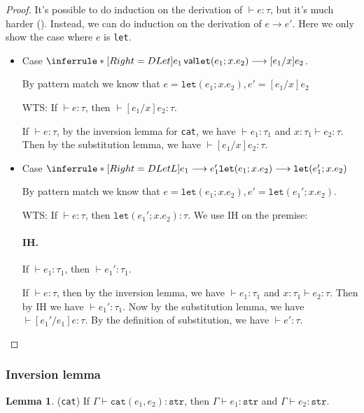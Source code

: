 \documentclass{article}
\theoremstyle{definition}
\newtheorem{lemma}{Lemma}[section]
\begin{document}
\begin{proof}
    It's possible to do induction on the derivation of $\vdash e:\tau$, but it's much harder (\cite{int}). Instead, we can do induction on the derivation of $e\longrightarrow e'$. Here we only show the case where $e$ is \texttt{let}.

    \begin{itemize}
        \item Case $\inferrule*[Right=DLet]{e_1\, \mathsf{val}}{\mathtt{let}(e_1;x.e_2) \longrightarrow [e_1/x]e_2}$.

              By pattern match we know that $e = \mathtt{let}(e_1;x.e_2), e' = [e_1/x]e_2$

              WTS: If $\vdash e:\tau$, then $\vdash [e_1/x]e_2: \tau$.

              If $\vdash e:\tau$, by the inversion lemma for \texttt{cat}, we have $\vdash e_1:\tau_1$ and $x:\tau_1 \vdash e_2:\tau$. Then by the substitution lemma, we have $\vdash [e_1/x]e_2: \tau$.
        \item Case $\inferrule*[Right=DLetL]{e_1\longrightarrow e_1'}{\mathtt{let}(e_1;x.e_2) \longrightarrow \mathtt{let}(e_1';x.e_2)}$

              By pattern match we know that $e= \mathtt{let}(e_1;x.e_2), e' = \mathtt{let}(e_1';x.e_2)$.

              WTS: If $\vdash e:\tau$, then $\mathtt{let}(e_1';x.e_2): \tau$.
              We use IH on the premise:
              \paragraph*{IH.} If $\vdash e_1:\tau_1$, then $\vdash e_1':\tau_1$.

              If $\vdash e:\tau$, then by the inversion lemma, we have $\vdash e_1:\tau_1$ and $x:\tau_1 \vdash e_2:\tau$. Then by IH we have $\vdash e_1':\tau_1$.
              Now by the substitution lemma, we have $\vdash [e_1'/e_1]e:\tau$. By the definition of substitution, we have $\vdash e': \tau$.
    \end{itemize}
\end{proof}

\subsubsection*{Inversion lemma}
\begin{lemma}
    (\texttt{cat}) If $\Gamma\vdash \mathtt{cat}(e_1,e_2):\mathtt{str}$, then $\Gamma \vdash e_1:\mathtt{str}$ and $\Gamma\vdash e_2:\mathtt{str}$.
\end{lemma}
\end{document}
